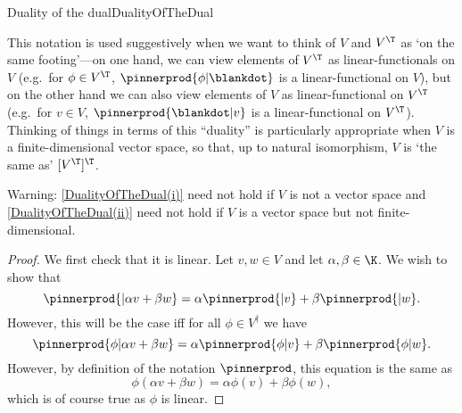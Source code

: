 \begin{thm}{Duality of the dual}{DualityOfTheDual}
\begin{rmk}
		This notation is used suggestively when we want to think of $V$ and $V^{\T}$ as `on the same footing'---on one hand, we can view elements of $V^{\T}$ as linear-functionals on $V$ (e.g.~for $\phi \in V^{\T}$, $\pinnerprod{\phi |\blankdot}$ is a linear-functional on $V$), but on the other hand we can also view elements of $V$ as linear-functional on $V^{\T}$ (e.g.~for $v\in V$, $\pinnerprod{\blankdot |v}$ is a linear-functional on $V^{\T}$).  Thinking of things in terms of this ``duality'' is particularly appropriate when $V$ is a finite-dimensional vector space, so that, up to natural isomorphism, $V$ is `the same as' $[V^{\T}]^{\T}$.
	\end{rmk}
	\begin{rmk}
		Warning:  \cref{DualityOfTheDual(i)} need not hold if $V$ is not a vector space and \cref{DualityOfTheDual(ii)} need not hold if $V$ is a vector space but not finite-dimensional.
	\end{rmk}
	\begin{proof}
		We first check that it is linear.  Let $v,w\in V$ and let $\alpha ,\beta \in \K$.  We wish to show that
		\begin{equation}
		\pinnerprod{|\alpha v+\beta w}=\alpha \pinnerprod{|v}+\beta \pinnerprod{|w}.
		\end{equation}
		However, this will be the case iff for all $\phi \in V^{\dagger}$ we have
		\begin{equation}
		\pinnerprod{\phi|\alpha v+\beta w}=\alpha \pinnerprod{\phi |v}+\beta \pinnerprod{\phi |w}.
		\end{equation}
		However, by definition of the notation $\pinnerprod$, this equation is the same as
		\begin{equation}
		\phi (\alpha v+\beta w)=\alpha \phi (v)+\beta \phi (w),
		\end{equation}
		which is of course true as $\phi$ is linear.
		

\end{proof}
\end{thm}

